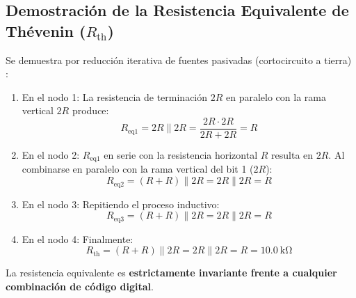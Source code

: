 \documentclass[11pt,letterpaper]{article}
\begin{document}
\subsection{Demostración de la Resistencia Equivalente de Thévenin ($R_{\text{th}}$)}
Se demuestra por reducción iterativa de fuentes pasivadas (cortocircuito a tierra) \cite{hayt2012}:
\begin{enumerate}
    \item En el nodo 1: La resistencia de terminación $2R$ en paralelo con la rama vertical $2R$ produce:
    \begin{equation}
    R_{\text{eq1}} = 2R \parallel 2R = \frac{2R \cdot 2R}{2R + 2R} = R
    \end{equation}
    \item En el nodo 2: $R_{\text{eq1}}$ en serie con la resistencia horizontal $R$ resulta en $2R$. Al combinarse en paralelo con la rama vertical del bit 1 ($2R$):
    \begin{equation}
    R_{\text{eq2}} = (R + R) \parallel 2R = 2R \parallel 2R = R
    \end{equation}
    \item En el nodo 3: Repitiendo el proceso inductivo:
    \begin{equation}
    R_{\text{eq3}} = (R + R) \parallel 2R = 2R \parallel 2R = R
    \end{equation}
    \item En el nodo 4: Finalmente:
    \begin{equation}
    \boxed{R_{\text{th}} = (R + R) \parallel 2R = 2R \parallel 2R = R = \SI{10.0}{\kilo\ohm}}
    \end{equation}
\end{enumerate}
La resistencia equivalente es \textbf{estrictamente invariante frente a cualquier combinación de código digital}.
\end{document}
